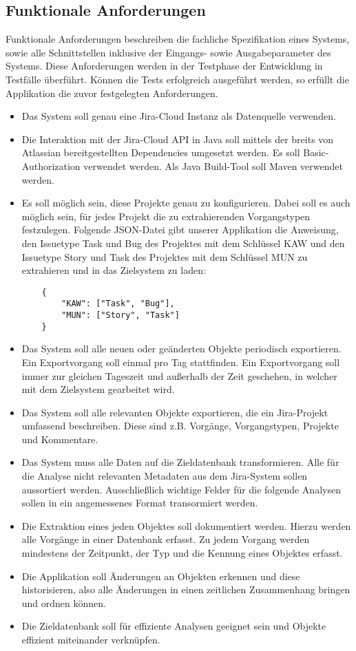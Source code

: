 \documentclass[10pt]{article}
\begin{document}
\subsection{Funktionale Anforderungen}
Funktionale Anforderungen beschreiben die fachliche Spezifikation eines Systems, sowie alle Schnittstellen inklusive der Eingangs- sowie Ausgabeparameter des Systems. Diese Anforderungen werden in der Testphase der Entwicklung in Testfälle überführt. Können die Tests erfolgreich ausgeführt werden, so erfüllt die Applikation die zuvor festgelegten Anforderungen.\\
\begin{itemize}
  \item Das System soll genau eine Jira-Cloud Instanz als Datenquelle verwenden. 
  \item Die Interaktion mit der Jira-Cloud API in Java soll mittels der breits von Atlassian bereitgestellten Dependencies umgesetzt werden. Es soll Basic-Authorization verwendet werden. Als Java Build-Tool soll Maven verwendet werden.
  \item Es soll möglich sein, diese Projekte genau zu konfigurieren. Dabei soll es auch möglich sein, für jedes Projekt die zu extrahierenden Vorgangstypen festzulegen. Folgende JSON-Datei gibt unserer Applikation die Anweisung, den Issuetype Task und Bug des Projektes mit dem Schlüssel KAW und den Issuetype Story und Task des Projektes mit dem Schlüssel MUN zu extrahieren und in das Zielsystem zu laden:
    \begin{lstlisting}
    {
        "KAW": ["Task", "Bug"],
        "MUN": ["Story", "Task"]
    }
    \end{lstlisting}
  \item Das System soll alle neuen oder geänderten Objekte periodisch exportieren. Ein Exportvorgang soll einmal pro Tag stattfinden. Ein Exportvorgang soll immer zur gleichen Tageszeit und außerhalb der Zeit geschehen, in welcher mit dem Zielsystem gearbeitet wird.
  \item Das System soll alle relevanten Objekte exportieren, die ein Jira-Projekt umfassend beschreiben. Diese sind z.B. Vorgänge, Vorgangstypen, Projekte und Kommentare.
  \item Das System muss alle Daten auf die Zieldatenbank transformieren. Alle für die Analyse nicht relevanten Metadaten aus dem Jira-System sollen aussortiert werden. Ausschließlich wichtige Felder für die folgende Analysen sollen in ein angemessenes Format transormiert werden.
  \item Die Extraktion eines jeden Objektes soll dokumentiert werden. Hierzu werden alle Vorgänge in einer Datenbank erfasst. Zu jedem Vorgang werden mindestens der Zeitpunkt, der Typ und die Kennung eines Objektes erfasst.
  \item Die Applikation soll Änderungen an Objekten erkennen und diese historisieren, also alle Änderungen in einen zeitlichen Zusammenhang bringen und ordnen können.
  \item Die Zieldatenbank soll für effiziente Analysen geeignet sein und Objekte effizient miteinander verknüpfen.
\end{itemize}
\end{document}
